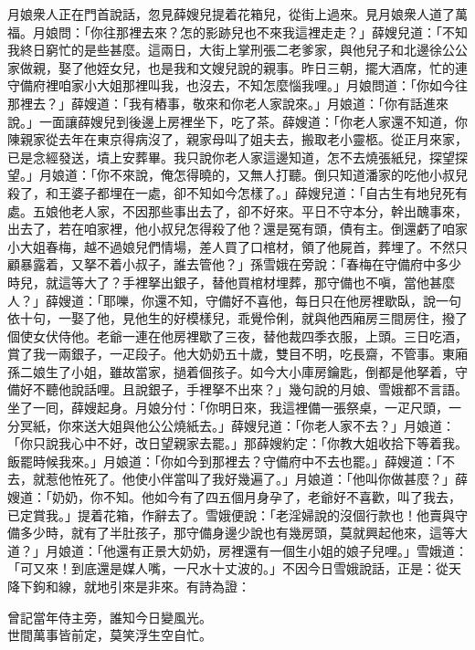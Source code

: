 月娘衆人正在門首說話，忽見薛嫂兒提着花箱兒，從街上過來。見月娘衆人道了萬福。月娘問：「你往那裡去來？怎的影跡兒也不來我這裡走走？」薛嫂兒道：「不知我終日窮忙的是些甚麼。這兩日，大街上掌刑張二老爹家，與他兒子和北邊徐公公家做親，娶了他姪女兒，也是我和文嫂兒說的親事。昨日三朝，擺大酒席，忙的連守備府裡咱家小大姐那裡叫我，也沒去，不知怎麼惱我哩。」月娘問道：「你如今往那裡去？」薛嫂道：「我有樁事，敬來和你老人家說來。」月娘道：「你有話進來說。」一面讓薛嫂兒到後邊上房裡坐下，吃了茶。薛嫂道：「你老人家還不知道，你陳親家從去年在東京得病沒了，親家母叫了姐夫去，搬取老小靈柩。從正月來家，已是念經發送，墳上安葬畢。我只說你老人家這邊知道，怎不去燒張紙兒，探望探望。」月娘道：「你不來說，俺怎得曉的，又無人打聽。{}倒只知道潘家的吃他小叔兒殺了，和王婆子都埋在一處，卻不知如今怎樣了。」薛嫂兒道：「自古生有地兒死有處。五娘他老人家，不因那些事出去了，卻不好來。平日不守本分，幹出醜事來，出去了，若在咱家裡，他小叔兒怎得殺了他？還是冤有頭，債有主。倒還虧了咱家小大姐春梅，越不過娘兒們情場，差人買了口棺材，領了他屍首，葬埋了。不然只顧暴露着，又拏不着小叔子，誰去管他？」孫雪娥在旁說：「春梅在守備府中多少時兒，就這等大了？手裡拏出銀子，替他買棺材埋葬，那守備也不嗔，當他甚麼人？」{}薛嫂道：「耶嚛，你還不知，守備好不喜他，每日只在他房裡歇臥，說一句依十句，一娶了他，見他生的好模樣兒，乖覺伶俐，就與他西廂房三間房住，撥了個使女伏侍他。老爺一連在他房裡歇了三夜，替他裁四季衣服，上頭。三日吃酒，賞了我一兩銀子，一疋段子。他大奶奶五十歲，雙目不明，吃長齋，不管事。東廂孫二娘生了小姐，雖故當家，撾着個孩子。如今大小庫房鑰匙，倒都是他拏着，守備好不聽他說話哩。且說銀子，手裡拏不出來？」{}幾句說的月娘、雪娥都不言語。坐了一囘，薛嫂起身。月娘分付：「你明日來，我這裡備一張祭桌，一疋尺頭，一分冥紙，你來送大姐與他公公燒紙去。」薛嫂兒道：「你老人家不去？」月娘道：「你只說我心中不好，改日望親家去罷。」{}那薛嫂約定：「你教大姐收拾下等着我。飯罷時候我來。」月娘道：「你如今到那裡去？守備府中不去也罷。」薛嫂道：「不去，就惹他恠死了。他使小伴當叫了我好幾遍了。」月娘道：「他叫你做甚麼？」薛嫂道：「奶奶，你不知。他如今有了四五個月身孕了，老爺好不喜歡，叫了我去，已定賞我。」提着花箱，作辭去了。雪娥便說：「老淫婦說的沒個行款也！他賣與守備多少時，就有了半肚孩子，那守備身邊少說也有幾房頭，莫就興起他來，這等大道？」{}月娘道：「他還有正景大奶奶，房裡還有一個生小姐的娘子兒哩。」雪娥道：「可又來！到底還是媒人嘴，一尺水十丈波的。」不因今日雪娥說話，正是：從天降下鉤和線，就地引來是非來。有詩為證：

\begin{myquote}
曾記當年侍主旁，誰知今日變風光。\\世間萬事皆前定，莫笑浮生空自忙。
\end{myquote}

